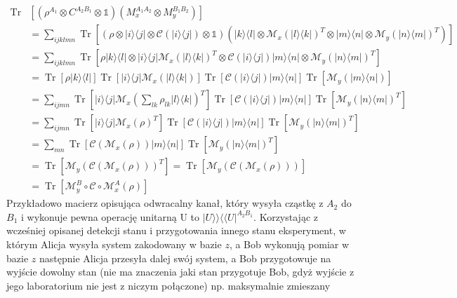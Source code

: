 \documentclass[10pt]{article} %
\DeclareMathOperator{\Trs}{Tr}
\newcommand{\Ket}[1]{|#1\rangle}
\newcommand{\Bra}[1]{\langle#1|}
\newcommand{\BBra}[1]{\langle\langle#1|}
\newcommand{\KKet}[1]{|#1\rangle\rangle}
\newcommand{\I}{\mathbb{1}}
\begin{document}
\begin{equation}
\begin{split}
\Trs&\left[ \left(\rho^{A_1} \otimes C^{A_2B_1} \otimes \I \right)\left(M_x^{A_1A_2}\otimes M_y^{B_1B_2}\right)\right] \\
&= \sum_{ijklmn} \Trs \left[ \left(\rho \otimes \Ket{i}\Bra{j} \otimes \mathcal{C}(\Ket{i}\Bra{j}) \otimes \I\right)\left(\Ket{k}\Bra{l} \otimes \mathcal{M}_x(\Ket{l}\Bra{k})^T \otimes \Ket{m}\Bra{n} \otimes \mathcal{M}_y(\Ket{n}\Bra{m})^T\right)\right] \\
&= \sum_{ijklmn} \Trs \left[ \rho \Ket{k}\Bra{l} \otimes \Ket{i}\Bra{j}\mathcal{M}_x(\Ket{l}\Bra{k})^T \otimes \mathcal{C}(\Ket{i}\Bra{j})\Ket{m}\Bra{n} \otimes \mathcal{M}_y(\Ket{n}\Bra{m})^T\right] \\
&= \Trs\left[\rho\Ket{k}\Bra{l}\right] \Trs\left[\Ket{i}\Bra{j}\mathcal{M}_x(\Ket{l}\Bra{k})\right] \Trs\left[\mathcal{C}(\Ket{i}\Bra{j}) \Ket{m}\Bra{n}\right] \Trs\left[\mathcal{M}_y(\Ket{m}\Bra{n})\right] \\
&= \sum_{ijmn}  \Trs\left[\Ket{i}\Bra{j}\mathcal{M}_x(\sum_{lk} \rho_{lk} \Ket{l}\Bra{k})^T\right] \Trs\left[\mathcal{C}(\Ket{i}\Bra{j}) \Ket{m}\Bra{n}\right] \Trs\left[\mathcal{M}_y(\Ket{n}\Bra{m})^T\right] \\
&= \sum_{ijmn}  \Trs\left[\Ket{i}\Bra{j}\mathcal{M}_x(\rho)^T\right] \Trs\left[\mathcal{C}(\Ket{i}\Bra{j}) \Ket{m}\Bra{n}\right] \Trs\left[\mathcal{M}_y(\Ket{n}\Bra{m})^T\right] \\
&= \sum_{mn} \Trs \left[ \mathcal{C}(\mathcal{M}_x(\rho))\Ket{m}\Bra{n}\right]\Trs\left[\mathcal{M}_y(\Ket{n}\Bra{m})^T\right] \\
&=  \Trs\left[ \mathcal{M}_y (\mathcal{C}(\mathcal{M}_x(\rho)))^T\right] = \Trs\left[ \mathcal{M}_y (\mathcal{C}(\mathcal{M}_x(\rho)))\right] \\
&=\Trs \left[ \mathcal{M}_y^B \circ \mathcal{C} \circ \mathcal{M}_x^A(\rho)\right]
\end{split}
\end{equation}
Przykładowo macierz opisująca odwracalny kanał, który wysyła cząstkę z $A_2$ do $B_1$ i wykonuje pewna operację unitarną U to $\KKet{U}\BBra{U}^{A_2B_1}$. Korzystając z wcześniej opisanej detekcji stanu i przygotowania innego stanu eksperyment, w którym Alicja wysyła system zakodowany w bazie $z$, a Bob wykonują pomiar w bazie $z$ następnie Alicja przesyła dalej swój system, a Bob przygotowuje na wyjście dowolny stan (nie ma znaczenia jaki stan przygotuje Bob, gdyż wyjście z jego laboratorium nie jest z niczym połączone) np. maksymalnie zmieszany
\end{document}
